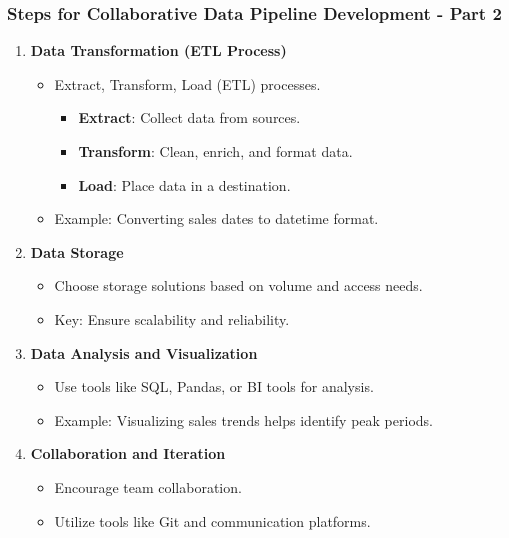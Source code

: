 \documentclass{beamer}
\begin{document}
\begin{frame}[fragile]
    \frametitle{Steps for Collaborative Data Pipeline Development - Part 2}
    \begin{enumerate}[resume]
        \item \textbf{Data Transformation (ETL Process)}
        \begin{itemize}
            \item Extract, Transform, Load (ETL) processes.
            \begin{itemize}
                \item \textbf{Extract}: Collect data from sources.
                \item \textbf{Transform}: Clean, enrich, and format data.
                \item \textbf{Load}: Place data in a destination.
            \end{itemize}
            \item Example: Converting sales dates to datetime format.
        \end{itemize}
        
        \item \textbf{Data Storage}
        \begin{itemize}
            \item Choose storage solutions based on volume and access needs.
            \item Key: Ensure scalability and reliability.
        \end{itemize}

        \item \textbf{Data Analysis and Visualization}
        \begin{itemize}
            \item Use tools like SQL, Pandas, or BI tools for analysis.
            \item Example: Visualizing sales trends helps identify peak periods.
        \end{itemize}

        \item \textbf{Collaboration and Iteration}
        \begin{itemize}
            \item Encourage team collaboration.
            \item Utilize tools like Git and communication platforms.
        \end{itemize}
    \end{enumerate}
\end{frame}
\end{document}

